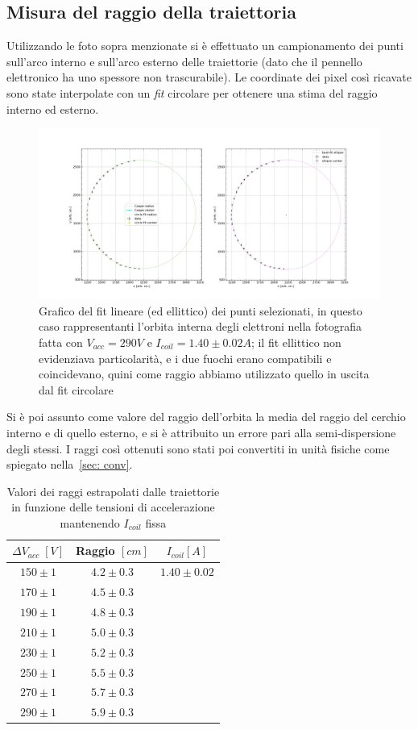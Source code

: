 \documentclass[10pt, a4paper, italian]{article}
\begin{document}
\subsection{Misura del raggio della traiettoria}
Utilizzando le foto sopra menzionate si è effettuato un campionamento dei punti
sull'arco interno e sull'arco esterno delle traiettorie (dato che il pennello elettronico ha uno spessore non trascurabile). Le coordinate dei pixel così ricavate
sono state interpolate con un \emph{fit} circolare per ottenere una stima del
raggio interno ed esterno.
\begin{figure}
\includegraphics[width=\textwidth]{circfit}
\caption{Grafico del fit lineare (ed ellittico) dei punti selezionati, in questo caso rappresentanti l'orbita interna degli elettroni nella fotografia fatta con $V_{acc}=290 V$ e $I_{coil}=1.40 \pm 0.02 A$; il fit ellittico non evidenziava particolarità, e i due fuochi erano compatibili e coincidevano, quini come raggio abbiamo utilizzato quello in uscita dal fit circolare}
\end{figure}
Si è poi assunto come valore del raggio dell'orbita la media del raggio del cerchio interno e di quello esterno,
e si è attribuito un errore pari alla semi-dispersione degli stessi.
I raggi così ottenuti sono stati poi convertiti in unità fisiche come spiegato
nella~\cref{sec: conv}. \\
\begin{table}[htbp]
\centering
\begin{tabular}{cc|c}
\toprule
$\Delta V_{acc} \; [\si{V}]$ & Raggio $[\si{cm}]$ & $I_{coil} [A]$ \\
\midrule

$150 \pm 1$ & $4.2 \pm 0.3$ & $1.40 \pm 0.02$\\
$170 \pm 1$ & $4.5 \pm 0.3$ & \\
$190 \pm 1$ & $4.8 \pm 0.3$ & \\
$210 \pm 1$ & $5.0 \pm 0.3$ & \\
$230 \pm 1$ & $5.2 \pm 0.3$ & \\
$250 \pm 1$ & $5.5 \pm 0.3$ & \\
$270 \pm 1$ & $5.7 \pm 0.3$ & \\
$290 \pm 1$ & $5.9 \pm 0.3$ & \\
\bottomrule
\end{tabular}
\caption{Valori dei raggi estrapolati dalle traiettorie in funzione delle tensioni di accelerazione mantenendo $I_{coil}$ fissa}
\end{table}
\end{document}
